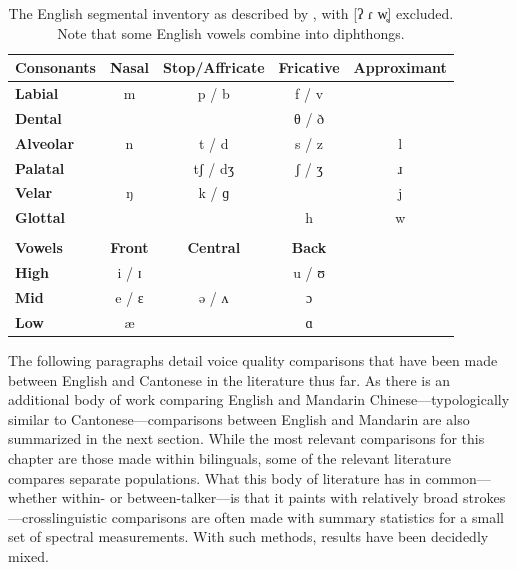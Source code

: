 \begin{table}[htbp]
    \caption{The English segmental inventory as described by \citet{wilson_2011_language}, with [{\ipafont ʔ ɾ w̥}] excluded. Note that some English vowels combine into diphthongs.}
    \label{ch3:tab:englishinventory}
    \centering
    \begin{tabular}{lcccc}
    \toprule
    \textbf{Consonants}  & \textbf{Nasal} & \textbf{Stop/Affricate} & \textbf{Fricative} & \textbf{Approximant} \\
    \midrule
    \textbf{Labial}	 	   &  m			   & p / b 		             & f / v 			  & 					 \\
    \textbf{Dental}        & 			   & 				         & {\ipafont θ / ð}	  &						 \\
    \textbf{Alveolar}      &  n 		   & t / d                   & s / z			  & l 				     \\
    \textbf{Palatal}       &			   & {\ipafont tʃ / dʒ}      & {\ipafont ʃ / ʒ}   & {\ipafont ɹ}	     \\
    \textbf{Velar}         &  {\ipafont ŋ} & k / {\ipafont ɡ}        &					  & j					 \\
    \textbf{Glottal}       &               &  				         & h 				  & w            		 \\
                           &               &                         &                   &                      \\
    \midrule
    \textbf{Vowels}      & \textbf{Front}     & \textbf{Central}  & \textbf{Back}        &                      \\
    \midrule 
    \textbf{High}        & i / {\ipafont ɪ}   &                   & u / {\ipafont ʊ}    &                       \\
    \textbf{Mid}         & {\ipafont e / ɛ}   & {\ipafont ə / ʌ } & {\ipafont ɔ }       &                       \\
    \textbf{Low}         & {\ipafont æ}       & 				  & {\ipafont ɑ }       &                       \\
    \bottomrule                
    \end{tabular}
\end{table}

The following paragraphs detail voice quality comparisons that have been made between English and Cantonese in the literature thus far. As there is an additional body of work comparing English and Mandarin Chinese---typologically similar to Cantonese---comparisons between English and Mandarin are also summarized in the next section. While the most relevant comparisons for this chapter are those made within bilinguals, some of the relevant literature compares separate populations. What this body of literature has in common---whether within- or between-talker---is that it paints with relatively broad strokes---crosslinguistic comparisons are often made with summary statistics for a small set of spectral measurements. With such methods, results have been decidedly mixed. 

